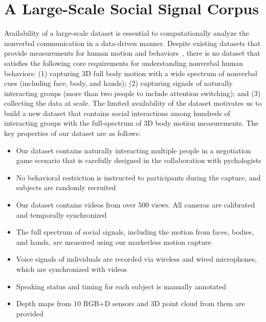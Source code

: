 
\chapter{A Large-Scale Social Signal Corpus}
\label{chapter:dataset}
Availability of a large-scale dataset is essential to computationally analyze the nonverbal communication in a data-driven manner. Despite existing datasets that provide measurements for human motion and behaviors~\cite{carletta2005ami, Lepri-12, Zen-10,Cristani-11, SALSA-15, h36m_pami}, there is no dataset that satisfies the following core requirements for understanding nonverbal human behaviors: (1) capturing 3D full body motion with a wide spectrum of nonverbal cues (including face, body, and hands); (2) capturing signals of naturally interacting groups (more than two people to include attention switching); and (3) collecting the data at scale. The limited availability of the dataset motivates us to build a new dataset that contains social interactions among hundreds of interacting groups with the full-spectrum of 3D body motion measurements. The key properties of our dataset are as follows:
\begin{itemize}
	\item Our dataset contains naturally interacting multiple people in a negotiation game scenario that is carefully designed in the collaboration with pychologists
	\item No behavioral restriction is instructed to participants during the capture, and subjects are randomly recruited
	\item Our dataset contains videos from over 500 views. All cameras are calibrated and temporally synchronized
	\item The full spectrum of social signals, including the motion from faces, bodies, and hands, are measured using our markerless motion capture~\cite{joo2017panoptic, joo2018}
	\item Voice signals of individuals are recorded via wireless and wired microphones, which are synchronized with videos
	\item Speaking status and timing for each subject is manually annotated
	\item Depth maps from 10 RGB+D sensors and 3D point cloud from them are provided
\end{itemize}

